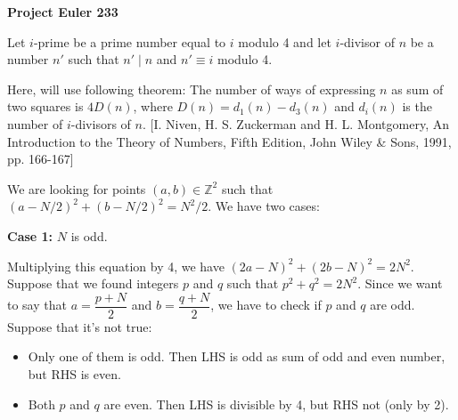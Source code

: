 \documentclass[a4paper,12pt]{article}
\begin{document}
\setlength\parindent{0pt}
\textbf{Project Euler 233}
\vspace{5ex}

Let \(i\)-prime be a prime number equal to \(i\) modulo 4 and let \(i\)-divisor of \(n\) be a number \(n'\) such that \(n' \mid n\) and \(n' \equiv i\) modulo 4.

Here, will use following theorem: The number of ways of expressing \(n\) as sum of two squares is \(4D(n)\), where \(D(n) = d_1(n) - d_3(n)\) and \(d_i(n)\) is the number of \(i\)-divisors of \(n\).
[I. Niven, H. S. Zuckerman and H. L. Montgomery, An Introduction to the Theory of Numbers, Fifth Edition, John Wiley \& Sons, 1991, pp. 166-167]

We are looking for points \((a, b) \in \mathbb{Z}^2\) such that \((a - N/2)^2 + (b - N/2)^2 = N^2/2\). We have two cases:

\textbf{Case 1:} \(N\) is odd.

Multiplying this equation by 4, we have \((2a - N)^2 + (2b - N)^2 = 2N^2\). Suppose that we found integers \(p\) and \(q\) such that \(p^2 + q^2 = 2N^2\). Since we want to say that \(a = \dfrac{p + N}{2}\) and \(b = \dfrac{q + N}{2}\), we have to check if \(p\) and \(q\) are odd. Suppose that it's not true:
\begin{itemize}
\item Only one of them is odd. Then LHS is odd as sum of odd and even number, but RHS is even.
\item Both \(p\) and \(q\) are even. Then LHS is divisible by 4, but RHS not (only by 2).
\end{itemize}
\end{document}
